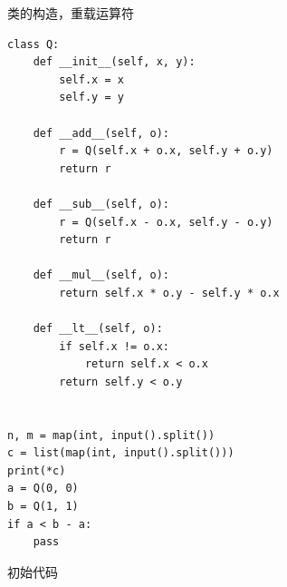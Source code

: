 \documentclass[12pt]{ctexart}
\begin{document}
类的构造，重载运算符
\begin{lstlisting}
class Q:
    def __init__(self, x, y):
        self.x = x
        self.y = y

    def __add__(self, o):
        r = Q(self.x + o.x, self.y + o.y)
        return r

    def __sub__(self, o):
        r = Q(self.x - o.x, self.y - o.y)
        return r

    def __mul__(self, o):
        return self.x * o.y - self.y * o.x

    def __lt__(self, o):
        if self.x != o.x:
            return self.x < o.x
        return self.y < o.y


n, m = map(int, input().split())
c = list(map(int, input().split()))
print(*c)
a = Q(0, 0)
b = Q(1, 1)
if a < b - a:
    pass

\end{lstlisting}

初始代码
\end{document}

